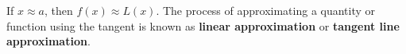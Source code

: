 \documentclass{book}
\begin{document}
If $x\approx a$, then $f(x) \approx L(x)$. The process of approximating a quantity or function using the tangent is known as \textbf{linear approximation} or \textbf{tangent line approximation}.


%
\end{document}
